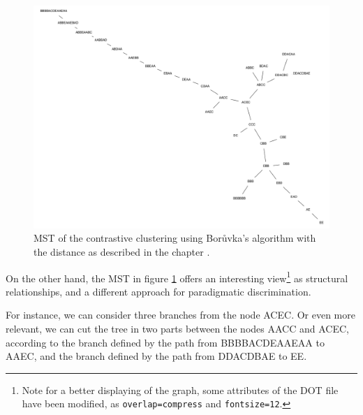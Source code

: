 \begin{figure}[!hbt]
	\begin{center}
		\includegraphics[width=\columnwidth]{img/mst2}
		\caption{MST of the contrastive clustering using Bor\r{u}vka's algorithm with the distance as described in the chapter \textsl{}.}
		\label{fig:mst2}
	\end{center}
\end{figure}

On the other hand, the MST in figure \ref{fig:mst2} offers an interesting view\footnote{Note for a better displaying of the graph, some attributes of the DOT file have been modified, as \texttt{overlap=compress} and \texttt{fontsize=12}.} as structural relationships, and a different approach for paradigmatic discrimination. 

\smallskip

For instance, we can consider three branches from the node \textsf{ACEC}. Or even more relevant, we can cut the tree in two parts between the nodes \textsf{AACC} and \textsf{ACEC}, according to the branch defined by the path from \textsf{BBBBACDEAAEAA} to \textsf{AAEC}, and the branch defined by the path from \textsf{DDACDBAE} to \textsf{EE}.